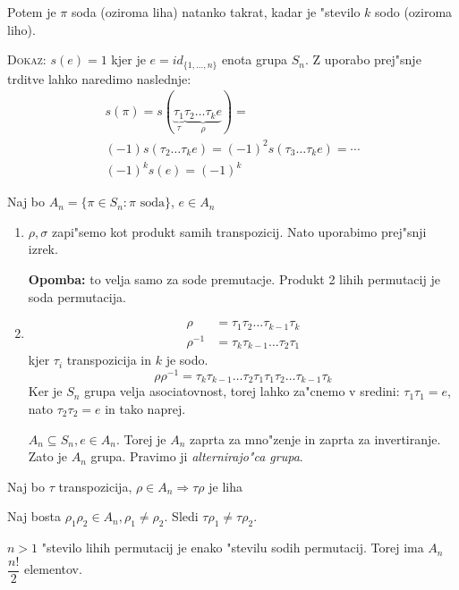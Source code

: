 Potem je $\pi$ soda (oziroma liha) natanko takrat, kadar je "stevilo $k$ sodo (oziroma liho).

\textsc{Dokaz:} $s(e) = 1$ kjer je $e = id_{\{1, \ldots, n\}}$ enota grupa $S_n$. Z uporabo prej"snje trditve lahko naredimo naslednje:
\begin{multline*}
s(\pi) = s(\underbrace{\tau_1}_{\tau} \underbrace{\tau_2 \ldots \tau_k e}_{\rho}) =\\
(-1)s(\tau_2 \ldots \tau_k e) = (-1)^2 s(\tau_3 \ldots \tau_k e) = \cdots  \\
 (-1)^k s(e) = (-1)^k
\end{multline*}

Naj bo $A_n = \{\pi \in S_n: \text{$\pi$ soda}\}$, $e \in A_n$
\begin{enumerate}[(1)]
	\item {}
	
	$\rho, \sigma$ zapi"semo kot produkt samih transpozicij. Nato uporabimo prej"snji izrek. 
	
	\textbf{Opomba:} to velja samo za sode premutacje. Produkt 2 lihih permutacij je soda permutacija.
	
	\item {}
	\begin{align*}
	\rho &= \tau_1 \tau_2 \ldots \tau_{k-1} \tau_k \\
	\rho^{-1} &= \tau_k \tau_{k-1} \ldots \tau_2 \tau_1
	\end{align*}
	kjer $\tau_i$ transpozicija in $k$ je sodo.
	\begin{equation*}
	\rho \rho^{-1} = \tau_k \tau_{k-1} \ldots \tau_2 \tau_1 \tau_1 \tau_2 \ldots \tau_{k-1} \tau_k
	\end{equation*}
	Ker je $S_n$ grupa velja asociatovnost, torej lahko za"cnemo v sredini: $\tau_1 \tau_1 = e$, nato $\tau_2 \tau_2 = e$ in tako naprej.
	
	$A_n \subseteq S_n, e \in A_n$. Torej je $A_n$ zaprta za mno"zenje in zaprta za invertiranje. Zato je $A_n$ grupa. Pravimo ji \emph{alternirajo"ca grupa}.
\end{enumerate}
Naj bo $\tau$ transpozicija, $\rho \in A_n \Rightarrow \tau \rho$ je liha

Naj bosta $\rho_1 \rho_2 \in A_n, \rho_1 \neq \rho_2$. Sledi $\tau \rho_1 \neq \tau \rho_2$.

$n>1$ "stevilo lihih permutacij je enako "stevilu sodih permutacij. Torej ima $A_n$ $\dfrac{n!}{2}$ elementov.

